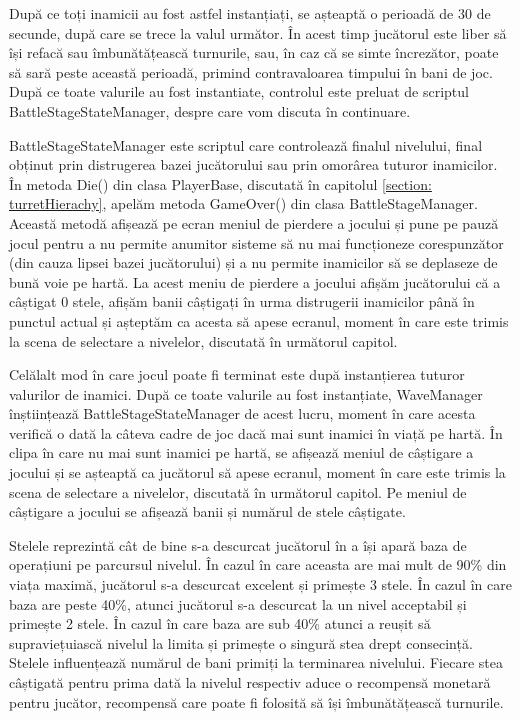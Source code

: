\documentclass[12pt, a4paper]{article}
\begin{document}
	După ce toți inamicii au fost astfel instanțiați, se așteaptă o perioadă de 30 de secunde, după care se trece la valul următor. În acest timp jucătorul este liber să își refacă sau îmbunătățească turnurile, sau, în caz că se simte încrezător, poate să sară peste această perioadă, primind contravaloarea timpului în bani de joc. După ce toate valurile au fost instantiate, controlul este preluat de scriptul BattleStageStateManager, despre care vom discuta în continuare.
	\newline
	
	BattleStageStateManager este scriptul care controlează finalul nivelului, final obținut prin distrugerea bazei jucătorului sau prin omorârea tuturor inamicilor. În metoda Die() din clasa PlayerBase, discutată în capitolul \ref{section: turretHierachy}, apelăm metoda GameOver() din clasa BattleStageManager. Această metodă afișează pe ecran meniul de pierdere a jocului și pune pe pauză jocul pentru a nu permite anumitor sisteme să nu mai funcționeze corespunzător (din cauza lipsei bazei jucătorului) și a nu permite inamicilor să se deplaseze de bună voie pe hartă. La acest meniu de pierdere a jocului afișăm jucătorului că a câștigat 0 stele, afișăm banii câștigați în urma distrugerii inamicilor până în punctul actual și așteptăm ca acesta să apese ecranul, moment în care este trimis la scena de selectare a nivelelor, discutată în următorul capitol.
	\newline
	
	Celălalt mod în care jocul poate fi terminat este după instanțierea tuturor valurilor de inamici. După ce toate valurile au fost instanțiate, WaveManager înștiințează BattleStageStateManager de acest lucru, moment în care acesta verifică o dată la câteva cadre de joc dacă mai sunt inamici în viață pe hartă. În clipa în care nu mai sunt inamici pe hartă, se afișează meniul de câștigare a jocului și se așteaptă ca jucătorul să apese ecranul, moment în care este trimis la scena de selectare a nivelelor, discutată în următorul capitol. Pe meniul de câștigare a jocului se afișează banii și numărul de stele câștigate. 
	\newline
	
	Stelele reprezintă cât de bine s-a descurcat jucătorul în a își apară baza de operațiuni pe parcursul nivelul. În cazul în care aceasta are mai mult de 90\% din viața maximă, jucătorul s-a descurcat excelent și primește 3 stele. În cazul în care baza are peste 40\%, atunci jucătorul s-a descurcat la un nivel acceptabil și primește 2 stele. În cazul în care baza are sub 40\% atunci a reușit să supraviețuiască nivelul la limita și primește o singură stea drept consecință. Stelele influențează numărul de bani primiți la terminarea nivelului. Fiecare stea câștigată pentru prima dată la nivelul respectiv aduce o recompensă monetară pentru jucător, recompensă care poate fi folosită să își îmbunătățească turnurile. 
	\newline
	
\end{document}
